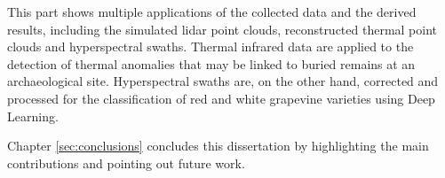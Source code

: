 \small \noindent \textbf{} \normalsize\hspace{\partTabSize} This part shows multiple applications of the collected data and the derived results, including the simulated \acrshort{lidar} point clouds, reconstructed thermal point clouds and hyperspectral swaths. Thermal infrared data are applied to the detection of thermal anomalies that may be linked to buried remains at an archaeological site. Hyperspectral swaths are, on the other hand, corrected and processed for the classification of red and white grapevine varieties using Deep Learning.

\small \noindent \textbf{} \normalsize\hspace{\partTabSize} Chapter \ref{sec:conclusions} concludes this dissertation by highlighting the main contributions and pointing out future work.
